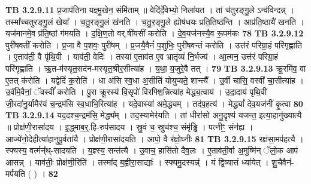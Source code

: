 \documentclass[17pt]{extarticle}
\begin{document}
{{{{{{{{{{{{{{{{{{{                  \newline
                                \textbf{ TB 3.2.9.11} \newline
                  प्र॒जाप॑तिना यज्ञ्मु॒खेन॒ संमि॑ताम् ॥ वेदि॑र्दे॒वेभ्यो॒ निला॑यत । तां च॑तुरङ्गु॒ले ऽन्व॑विन्दन्न् । तस्मा᳚च्चतुरङ्गु॒लं खेया᳚ । च॒तु॒रङ्गु॒लं ख॑नति । च॒तु॒र॒ङ्गु॒ले ह्योष॑धयः प्रति॒तिष्ठ॑न्ति । आप्र॑ति॒ष्ठायै॑ खनति । यज॑मानमे॒व प्र॑ति॒ष्ठां ग॑मयति । द॒क्षि॒ण॒तो वर्.षी॑यसीं करोति । दे॒व॒यज॑नस्यै॒व रू॒पम॑कः \textbf{ 78} \newline
                  \newline
                                \textbf{ TB 3.2.9.12} \newline
                  पुरी॑षवतीं करोति । प्र॒जा वै प॒शवः॒ पुरी॑षम् । प्र॒जयै॒वैनं॑ प॒शुभिः॒ पुरी॑षवन्तं करोति । उत्त॑रं परिग्रा॒हं परि॑गृह्णाति । ए॒ताव॑ती॒ वै पृ॑थि॒वी । याव॑ती॒ वेदिः॑ । तस्या॑ ए॒ताव॑त ए॒व भ्रातृ॑व्यं नि॒र्भज्य॑ । आ॒त्मन॒ उत्त॑रं परिग्रा॒हं परि॑गृह्णाति । ऋ॒त-म॑स्यृत॒सद॑न-मस्यृत॒श्रीर॒सीत्या॑ह । य॒था॒ य॒जुरे॒वै तत् । \textbf{ 79} \newline
                  \newline
                                \textbf{ TB 3.2.9.13} \newline
                  क्रू॒रमि॑व॒ वा ए॒तत् क॑रोति । यद्वेदिं॑ क॒रोति॑ । धा अ॑सि स्व॒धा अ॒सीति॑ योयुप्यते॒ शान्त्यै᳚ । उ॒र्वी चासि॒ वस्वी॑ चा॒सीत्या॑ह । उ॒र्वीमे॒वैनां॒ ॅवस्वीं᳚ करोति । पु॒रा क्रू॒रस्य॑ वि॒सृपो॑ विरफ्शि॒न्नित्या॑ह मेद्ध्य॒त्वाय॑ । उ॒दा॒दाय॑ पृथि॒वीं जी॒रदा॑नु॒र्यामैर॑यं च॒न्द्रम॑सि स्व॒धाभि॒रित्या॑ह । यदे॒वास्या॑ अमे॒द्ध्यम् । तद॑प॒हत्य॑ । मेद्ध्यां᳚ देव॒यज॑नीं कृ॒त्वा \textbf{ 80} \newline
                  \newline
                                \textbf{ TB 3.2.9.14} \newline
                  यद॒दश्च॒न्द्रम॑सि॒ मेद्ध्य᳚म् । तद॒स्यामेर॑यति । तां धीरा॑सो अनु॒दृश्य॑ यजन्त॒ इत्या॒हानु॑ख्यात्यै ॥ प्रोक्ष॑णी॒रासा॑दय । इ॒द्ध्माब॒र्॒.हि-रुप॑सादय । स्रु॒वं च॒ स्रुच॑श्च॒ संमृ॑ड्ढि । पत्नीꣳ॒॒ संन॑ह्य । आज्ये॑नो॒देहीत्या॑हानुपू॒र्वता॑यै । प्रोक्ष॑णी॒रासा॑दयति । आपो॒ वै र॑क्षो॒घ्नीः \textbf{ 81} \newline
                  \newline
                                \textbf{ TB 3.2.9.15} \newline
                  रक्ष॑सा॒मप॑हत्यै । स्फ्यस्य॒ वर्त्मन्᳚थ्-सादयति । य॒ज्ञ्स्य॒ सन्त॑त्यै । उ॒वाच॒ हासि॑तो दैव॒लः । ए॒ताव॑ती॒र्वा अ॒मुष्मि॑न् ॅलो॒क आप॑ आसन्न् । याव॑तीः॒ प्रोक्ष॑णी॒रिति॑ । तस्मा᳚द् ब॒ह्वीरा॒साद्याः᳚ । स्फ्यमु॒दस्यन्न्॑ । यं द्वि॒ष्यात्तं ध्या॑येत् । शु॒चैवैन॑-मर्पयति ( ) । \textbf{ 82} \newline
}}}}}}}}}}}}}}}}}}}
\end{document}
